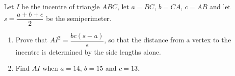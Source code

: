 Let $I$ be the incentre of triangle $ABC$, let $a=BC$, $b=CA$, $c=AB$ and let $s=\dfrac{a+b+c}{2}$ be the semiperimeter.
\begin{enumerate}
\item[(a)] Prove that $AI^2=\dfrac{bc(s-a)}{s}$, so that the distance from a vertex to the incentre is determined by the side lengths alone.
\item[(b)] Find $AI$ when $a=14$, $b=15$ and $c=13$.
\end{enumerate}

